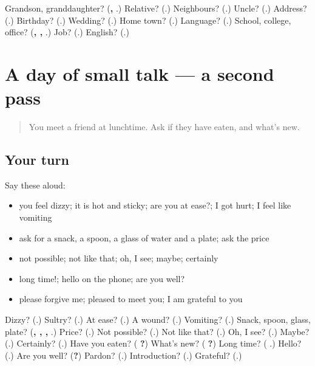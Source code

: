 \begin{tcolorbox}[breakable,colback=teal!4,colframe=teal!35!black,title={Before you move on}]
Grandson, granddaughter? (\textbf{, }.) Relative? (\textbf{}.) Neighbours? (\textbf{}.) Uncle? (\textbf{}.) Address? (\textbf{}.) Birthday? (\textbf{}.) Wedding? (\textbf{}.) Home town? (\textbf{}.) Language? (\textbf{}.) School, college, office? (\textbf{, , }.) Job? (\textbf{}.) English? (\textbf{}.)
\end{tcolorbox}
\section[(dialogue)]{A day of small talk — a second pass}

\label{lesson:KA-R97-second-pass-body-table-greetings}



\begin{quote}
You meet a friend at lunchtime. Ask if they have eaten, and what's new.
\end{quote}

\subsection*{Your turn}
Say these aloud:

\begin{itemize}
\raggedright
  \item you feel dizzy; it is hot and sticky; are you at ease?; I got hurt; I feel like vomiting
  \item ask for a snack, a spoon, a glass of water and a plate; ask the price
  \item not possible; not like that; oh, I see; maybe; certainly
  \item long time!; hello on the phone; are you well?
  \item please forgive me; pleased to meet you; I am grateful to you
\end{itemize}

\begin{tcolorbox}[breakable,colback=teal!4,colframe=teal!35!black,title={Before you move on}]
Dizzy? (\textbf{}.) Sultry? (\textbf{}.) At ease? (\textbf{}.) A wound? (\textbf{}.) Vomiting? (\textbf{}.) Snack, spoon, glass, plate? (\textbf{, , , }.) Price? (\textbf{}.) Not possible? (\textbf{}.) Not like that? (\textbf{}.) Oh, I see? (\textbf{}.) Maybe? (\textbf{}.) Certainly? (\textbf{}.) Have you eaten? (\textbf{ ?}) What's new? (\textbf{ ?}) Long time? (\textbf{  }.) Hello? (\textbf{}.) Are you well? (\textbf{?}) Pardon? (\textbf{}.) Introduction? (\textbf{}.) Grateful? (\textbf{}.)
\end{tcolorbox}
